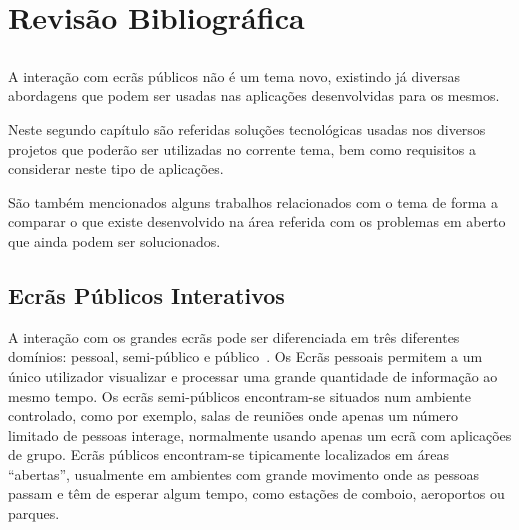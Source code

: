\chapter{Revisão Bibliográfica} \label{chap:biblio}

\section*{}

A interação com ecrãs públicos não é um tema novo, existindo já diversas abordagens que podem ser usadas nas aplicações desenvolvidas para os mesmos.
	
Neste segundo capítulo são referidas soluções tecnológicas usadas nos diversos projetos que poderão ser utilizadas no corrente tema, bem como requisitos a considerar neste tipo de aplicações.

São também mencionados alguns trabalhos relacionados com o tema de forma a comparar o que existe desenvolvido na área referida com os problemas em aberto que ainda podem ser solucionados. 

\section{Ecrãs Públicos Interativos}

A interação com os grandes ecrãs pode ser diferenciada em três diferentes domínios: pessoal, semi-público e público~\cite{Ballagas}. Os Ecrãs pessoais permitem a um único utilizador visualizar e processar uma grande quantidade de informação ao mesmo tempo. Os ecrãs semi-públicos encontram-se situados  num ambiente controlado, como  por exemplo, salas de reuniões onde apenas um número limitado de pessoas interage, normalmente usando apenas um ecrã com aplicações de grupo. Ecrãs públicos encontram-se tipicamente localizados em áreas ``abertas'', usualmente em ambientes com grande movimento onde as pessoas passam e têm de esperar algum tempo, como estações de comboio, aeroportos ou parques.


